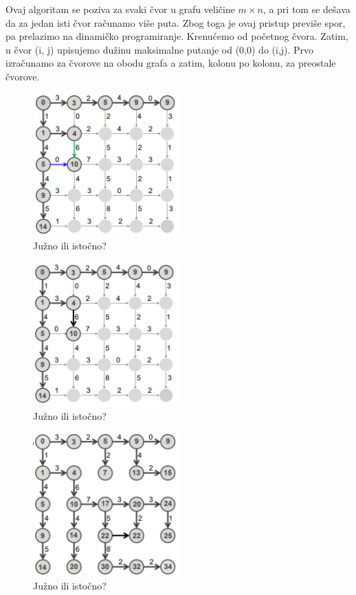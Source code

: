 \noindent Ovaj algoritam se poziva za svaki čvor u grafu veličine $m\times n$, a pri tom se dešava da za jedan isti čvor računamo više puta. Zbog toga je ovaj pristup previše spor, pa prelazimo na dinamičko programiranje.
Krenućemo  od početnog čvora. Zatim, u čvor (i, j) upisujemo dužinu maksimalne putanje od (0,0) do (i,j). Prvo izračunamo za čvorove na obodu grafa a zatim, kolonu po kolonu, za preostale čvorove.

\begin{figure}[h!]
\centering
\includegraphics[width=0.5\textwidth]{poglavlja/5/slike/putokazi1.png}
\caption{Južno ili istočno?}
\label{slika:putokazi1}
\end{figure}

\begin{figure}[h!]
\centering
\includegraphics[width=0.5\textwidth]{poglavlja/5/slike/putokazi2.png}
\caption{Južno ili istočno?}
\label{slika:putokazi2}
\end{figure}

\begin{figure}[h!]
\centering
\includegraphics[width=0.5\textwidth]{poglavlja/5/slike/putokazi3.png}
\caption{Južno ili istočno?}
\label{slika:putokazi3}
\end{figure}

